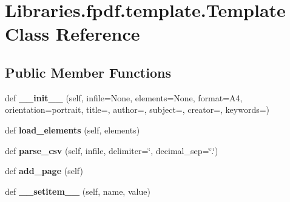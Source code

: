 \hypertarget{class_libraries_1_1fpdf_1_1template_1_1_template}{}\section{Libraries.\+fpdf.\+template.\+Template Class Reference}
\label{class_libraries_1_1fpdf_1_1template_1_1_template}
\subsection*{Public Member Functions}
\begin{DoxyCompactItemize}
\item 
def {\bfseries \+\_\+\+\_\+init\+\_\+\+\_\+} (self, infile=None, elements=None, format=\textquotesingle{}A4\textquotesingle{}, orientation=\textquotesingle{}portrait\textquotesingle{}, title=\textquotesingle{}\textquotesingle{}, author=\textquotesingle{}\textquotesingle{}, subject=\textquotesingle{}\textquotesingle{}, creator=\textquotesingle{}\textquotesingle{}, keywords=\textquotesingle{}\textquotesingle{})\hypertarget{class_libraries_1_1fpdf_1_1template_1_1_template_a129739c87bd7bd9a7ec58b7aac5d9958}{}\label{class_libraries_1_1fpdf_1_1template_1_1_template_a129739c87bd7bd9a7ec58b7aac5d9958}

\item 
def {\bfseries load\+\_\+elements} (self, elements)\hypertarget{class_libraries_1_1fpdf_1_1template_1_1_template_a9a25d48e258f5d6826b6c41d76fda7a7}{}\label{class_libraries_1_1fpdf_1_1template_1_1_template_a9a25d48e258f5d6826b6c41d76fda7a7}

\item 
def {\bfseries parse\+\_\+csv} (self, infile, delimiter=\char`\"{},  decimal\+\_\+sep=\char`\"{}.\char`\"{})\hypertarget{class_libraries_1_1fpdf_1_1template_1_1_template_af1100b7a1fdf38cb4329e53d26bd2d00}{}\label{class_libraries_1_1fpdf_1_1template_1_1_template_af1100b7a1fdf38cb4329e53d26bd2d00}

\item 
def {\bfseries add\+\_\+page} (self)\hypertarget{class_libraries_1_1fpdf_1_1template_1_1_template_a3ce8f466221961578d88a84c52c1b1a4}{}\label{class_libraries_1_1fpdf_1_1template_1_1_template_a3ce8f466221961578d88a84c52c1b1a4}

\item 
def {\bfseries \+\_\+\+\_\+setitem\+\_\+\+\_\+} (self, name, value)\hypertarget{class_libraries_1_1fpdf_1_1template_1_1_template_a0d4a107edad896bca1b6a2726df4a867}{}\label{class_libraries_1_1fpdf_1_1template_1_1_template_a0d4a107edad896bca1b6a2726df4a867}


\end{DoxyCompactItemize}
